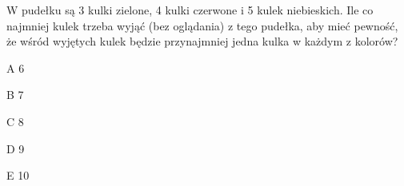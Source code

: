 \begin{tresc}
W pudełku są 3 kulki zielone, 4 kulki czerwone i 5 kulek niebieskich. Ile co najmniej kulek trzeba wyjąć (bez oglądania) z tego pudełka, aby mieć pewność, że wśród wyjętych kulek będzie przynajmniej jedna kulka w każdym z kolorów?
\end{tresc}
\begin{wariant}{A} 6 \end{wariant}
\begin{wariant}{B} 7 \end{wariant}
\begin{wariant}{C} 8 \end{wariant}
\begin{wariant}{D} 9 \end{wariant}
\begin{wariant}{E} 10 \end{wariant}
